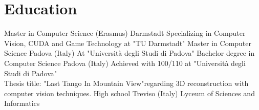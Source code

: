 \documentclass[letterpaper]{twentysecondcv} %
\begin{document}
\section{Education}

\begin{twenty} %
		{Master in Computer Science (Erasmus)}	{Darmstadt}
		{Specializing in Computer Vision, CUDA and Game Technology at "TU Darmstadt"\footnotemarkA[1]}
		{Master in Computer Science}	{Padova (Italy)}
		{At "Università degli Studi di Padova"\footnotemarkA[2]}
		{Bachelor degree in Computer Science}	{Padova (Italy)}
		{Achieved with 100/110 at "Università degli Studi di Padova"\footnotemarkA[2]\\
		Thesis title: "Last Tango In Mountain View"\footnotemarkA[3] regarding 3D reconstruction with computer vision techniques.}
		{High school}	{Treviso (Italy)}
		{Lyceum of Sciences and Informatics}
\end{twenty}







\end{document}
